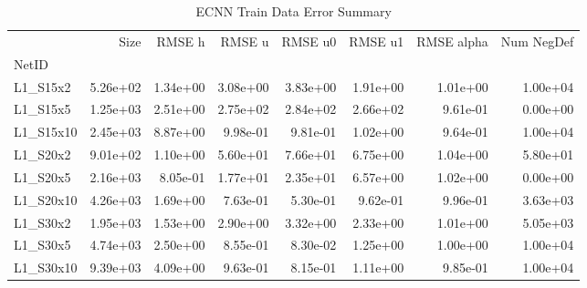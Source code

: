 \documentclass{article}
\theoremstyle{remark}
\numberwithin{equation}{subsection}
\begin{document}
\begin{table}[H]
\begin{tabular}{lrrrrrrr}
	\toprule
	{} &     Size &   RMSE h &   RMSE u &  RMSE u0 &  RMSE u1 &  RMSE alpha &  Num NegDef \\
	NetID     &          &          &          &          &          &             &             \\
	\midrule
	L1\_S15x2  & 5.26e+02 & 1.34e+00 & 3.08e+00 & 3.83e+00 & 1.91e+00 &    1.01e+00 &    1.00e+04 \\
	L1\_S15x5  & 1.25e+03 & 2.51e+00 & 2.75e+02 & 2.84e+02 & 2.66e+02 &    9.61e-01 &    0.00e+00 \\
	L1\_S15x10 & 2.45e+03 & 8.87e+00 & 9.98e-01 & 9.81e-01 & 1.02e+00 &    9.64e-01 &    1.00e+04 \\
	L1\_S20x2  & 9.01e+02 & 1.10e+00 & 5.60e+01 & 7.66e+01 & 6.75e+00 &    1.04e+00 &    5.80e+01 \\
	L1\_S20x5  & 2.16e+03 & 8.05e-01 & 1.77e+01 & 2.35e+01 & 6.57e+00 &    1.02e+00 &    0.00e+00 \\
	L1\_S20x10 & 4.26e+03 & 1.69e+00 & 7.63e-01 & 5.30e-01 & 9.62e-01 &    9.96e-01 &    3.63e+03 \\
	L1\_S30x2  & 1.95e+03 & 1.53e+00 & 2.90e+00 & 3.32e+00 & 2.33e+00 &    1.01e+00 &    5.05e+03 \\
	L1\_S30x5  & 4.74e+03 & 2.50e+00 & 8.55e-01 & 8.30e-02 & 1.25e+00 &    1.00e+00 &    1.00e+04 \\
	L1\_S30x10 & 9.39e+03 & 4.09e+00 & 9.63e-01 & 8.15e-01 & 1.11e+00 &    9.85e-01 &    1.00e+04 \\
	\bottomrule
\end{tabular}

\caption{ECNN Train Data Error Summary}
\end{table}
\end{document}
